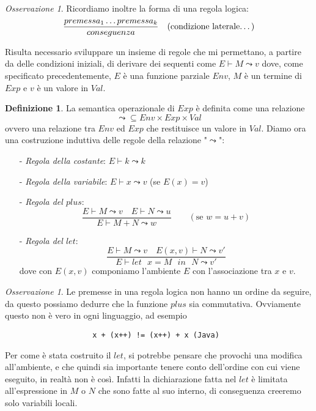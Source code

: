 \documentclass{article}
\theoremstyle{definition}
\theoremstyle{definition}
\theoremstyle{definition}
\newtheorem{definition}[theorem]{Definizione}
\theoremstyle{remark}
\newtheorem{remark}[theorem]{Osservazione}
\begin{document}
    \begin{remark}
        Ricordiamo inoltre la forma di una regola logica:
        $$\frac{premessa_1\dots premessa_k}{ conseguenza}\quad(\text{condizione laterale\dots})$$
    \end{remark}
    Risulta necessario sviluppare un insieme di regole che mi permettano, a partire da delle condizioni iniziali, di derivare
    dei sequenti come $E\vdash M \leadsto v$ dove, come specificato precedentemente, $E$ è una funzione parziale $Env$, $M$ è un termine di $Exp$
    e $v$ è un valore in $Val$.
    \begin{definition}La semantica operazionale di $Exp$ è definita come una relazione
        $$\leadsto  \subseteq Env\times Exp\times Val$$
        ovvero una relazione tra $Env$ ed $Exp$ che restituisce un valore in $Val$. Diamo ora una costruzione induttiva
        delle regole della  relazione "$\leadsto$":
        \begin{itemize}
            \item [-] \textit{Regola della costante}: $E\vdash k\leadsto k$
            \item [-] \textit{Regola della variabile}: $E\vdash x \leadsto v$ (se $E(x)= v$)
            \item [-] \textit{Regola del $plus$}: $$\frac{E\vdash M\leadsto v \quad E\vdash N\leadsto u} {E\vdash M+N\leadsto w}\qquad(\text{se $w = u+v$})$$
            \item [-] \textit{Regola del $let$}: $$\frac{E\vdash M\leadsto v \quad E(x,v)\vdash N\leadsto v'}{E\vdash \text{$let$ $x=M$ $in$ $N$}\leadsto v'}$$
                  dove con $E(x,v)$ componiamo l'ambiente $E$ con l'associazione tra $x$ e $v$.
        \end{itemize}
    \end{definition}
    \begin{remark}
        Le premesse in una regola logica non hanno un ordine da seguire, da questo possiamo dedurre
        che la funzione $plus$ sia commutativa. Ovviamente questo non è  vero in ogni linguaggio, ad esempio
        \begin{verbatim}                    x + (x++) != (x++) + x (Java)\end{verbatim}
        Per come è stata costruito il $let$, si potrebbe pensare che provochi una modifica all'ambiente,
        e che quindi sia importante tenere conto dell'ordine con cui viene eseguito, in realtà non è così.
        Infatti la dichiarazione  fatta nel $let$ è limitata all'espressione in $M$ o $N$ che
        sono fatte al suo interno, di conseguenza creeremo solo variabili locali.
    \end{remark}
\end{document}
